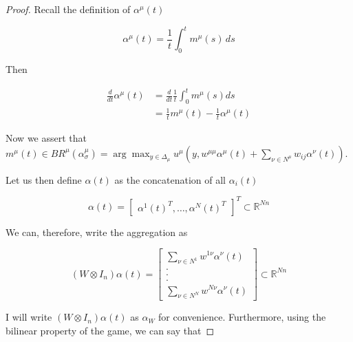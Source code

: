 \documentclass{article}
\theoremstyle{definition}
\begin{document}
  \begin{proof}
    Recall the definition of $\alpha^\mu(t)$

    \begin{equation*}
    \alpha^\mu(t) = \frac{1}{t} \int_{0}^{t} m^\mu(s) \, ds
    \end{equation*}

    Then 

    \begin{align}
    \frac{d}{dt} \alpha^\mu(t) & = \frac{d}{dt} \frac{1}{t} \int_{0}^t m^\mu(s) ds \nonumber \\
    & = \frac{1}{t} m^\mu(t) - \frac{1}{t} \alpha^\mu(t)
    \end{align}

    Now we assert that $m^\mu(t) \in BR^\mu(\alpha_{\sigma}^\mu) = \arg\max_{y \in \Delta_\mu} u^\mu(y,
    w^{\mu \mu} \alpha^\mu(t) + \sum_{\nu \in N^\mu} w_{ij} \alpha^\nu(t))$. 

    Let us then define $\alpha(t)$ as the concatenation of all $\alpha_i(t)$

    \begin{equation}
      \alpha(t) = \begin{bmatrix}
        \alpha^1(t)^T, \ldots, \alpha^N(t)^T
      \end{bmatrix}^T \subset \mathbb{R}^{Nn}
    \end{equation}


    We can, therefore, write the aggregation as

    \begin{equation}
      (W \otimes I_n) \alpha(t) = \begin{bmatrix}
        \sum_{\nu \in N^1} w^{1 \nu} \alpha^\nu(t) \\
        .\\
        .\\
        .\\
        \sum_{\nu \in N^N} w^{N \nu} \alpha^\nu(t)
      \end{bmatrix} \subset \mathbb{R}^{Nn}
    \end{equation}

    I will write $(W \otimes I_n) \alpha(t)$ as $\alpha_W$ for convenience. Furthermore, using
    the bilinear property of the game, we can say that


\end{proof}
\end{document}
